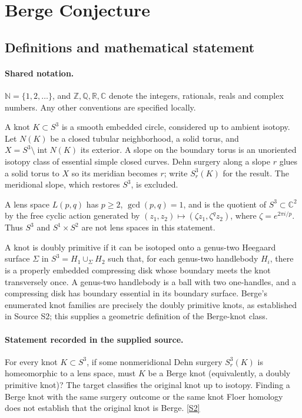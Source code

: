 \documentclass[11pt]{article}
\newcommand{\sref}[2]{\hyperlink{source:#1:#2}{[S#2]}}
\begin{document}
\section{Berge Conjecture}\label{statement}

\subsection{Definitions and mathematical statement}

\paragraph{Shared notation.}$\mathbb N=\{1,2,\ldots\}$, and $\mathbb Z,\mathbb Q,\mathbb R,\mathbb C$ denote the integers, rationals, reals and complex numbers. Any other conventions are specified locally.


A knot $K\subset S^3$ is a smooth embedded circle, considered up to ambient isotopy. Let $N(K)$ be a closed tubular neighborhood, a solid torus, and $X=S^3\setminus\operatorname{int}N(K)$ its exterior. A slope on the boundary torus is an unoriented isotopy class of essential simple closed curves. Dehn surgery along a slope $r$ glues a solid torus to $X$ so its meridian becomes $r$; write $S^3_r(K)$ for the result. The meridional slope, which restores $S^3$, is excluded.

A lens space $L(p,q)$ has $p\ge2$, $\gcd(p,q)=1$, and is the quotient of $S^3\subset\mathbb C^2$ by the free cyclic action generated by $(z_1,z_2)\mapsto(\zeta z_1,\zeta^q z_2)$, where $\zeta=e^{2\pi i/p}$. Thus $S^3$ and $S^1\times S^2$ are not lens spaces in this statement.

A knot is doubly primitive if it can be isotoped onto a genus-two Heegaard surface $\Sigma$ in $S^3=H_1\cup_\Sigma H_2$ such that, for each genus-two handlebody $H_i$, there is a properly embedded compressing disk whose boundary meets the knot transversely once. A genus-two handlebody is a ball with two one-handles, and a compressing disk has boundary essential in its boundary surface. Berge's enumerated knot families are precisely the doubly primitive knots, as established in Source S2; this supplies a geometric definition of the Berge-knot class.
\paragraph{Statement recorded in the supplied source.}
For every knot $K\subset S^3$, if some nonmeridional Dehn surgery $S^3_r(K)$ is homeomorphic to a lens space, must $K$ be a Berge knot (equivalently, a doubly primitive knot)? The target classifies the original knot up to isotopy. Finding a Berge knot with the same surgery outcome or the same knot Floer homology does not establish that the original knot is Berge. \sref{statement}{2}
\end{document}
